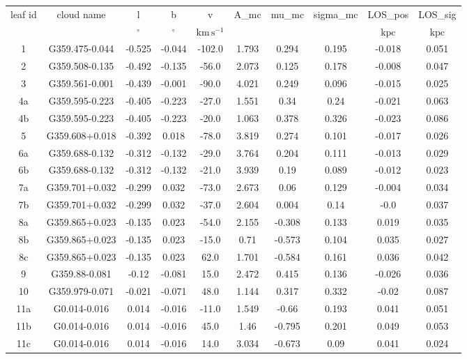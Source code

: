 \begin{table}
\begin{tabular}{cccccccccc}
leaf id & cloud name & l & b & v & A_mc & mu_mc & sigma_mc & LOS_pos & LOS_sig \\
 &  & $\mathrm{{}^{\circ}}$ & $\mathrm{{}^{\circ}}$ & $\mathrm{km\,s^{-1}}$ &  &  &  & $\mathrm{kpc}$ & $\mathrm{kpc}$ \\
1 & G359.475-0.044 & -0.525 & -0.044 & -102.0 & 1.793 & 0.294 & 0.195 & -0.018 & 0.051 \\
2 & G359.508-0.135 & -0.492 & -0.135 & -56.0 & 2.073 & 0.125 & 0.178 & -0.008 & 0.047 \\
3 & G359.561-0.001 & -0.439 & -0.001 & -90.0 & 4.021 & 0.249 & 0.096 & -0.015 & 0.025 \\
4a & G359.595-0.223 & -0.405 & -0.223 & -27.0 & 1.551 & 0.34 & 0.24 & -0.021 & 0.063 \\
4b & G359.595-0.223 & -0.405 & -0.223 & -20.0 & 1.063 & 0.378 & 0.326 & -0.023 & 0.086 \\
5 & G359.608+0.018 & -0.392 & 0.018 & -78.0 & 3.819 & 0.274 & 0.101 & -0.017 & 0.026 \\
6a & G359.688-0.132 & -0.312 & -0.132 & -29.0 & 3.764 & 0.204 & 0.111 & -0.013 & 0.029 \\
6b & G359.688-0.132 & -0.312 & -0.132 & -21.0 & 3.939 & 0.19 & 0.089 & -0.012 & 0.023 \\
7a & G359.701+0.032 & -0.299 & 0.032 & -73.0 & 2.673 & 0.06 & 0.129 & -0.004 & 0.034 \\
7b & G359.701+0.032 & -0.299 & 0.032 & -37.0 & 2.604 & 0.004 & 0.14 & -0.0 & 0.037 \\
8a & G359.865+0.023 & -0.135 & 0.023 & -54.0 & 2.155 & -0.308 & 0.133 & 0.019 & 0.035 \\
8b & G359.865+0.023 & -0.135 & 0.023 & -15.0 & 0.71 & -0.573 & 0.104 & 0.035 & 0.027 \\
8c & G359.865+0.023 & -0.135 & 0.023 & 62.0 & 1.701 & -0.584 & 0.161 & 0.036 & 0.042 \\
9 & G359.88-0.081 & -0.12 & -0.081 & 15.0 & 2.472 & 0.415 & 0.136 & -0.026 & 0.036 \\
10 & G359.979-0.071 & -0.021 & -0.071 & 48.0 & 1.144 & 0.317 & 0.332 & -0.02 & 0.087 \\
11a & G0.014-0.016 & 0.014 & -0.016 & -11.0 & 1.549 & -0.66 & 0.193 & 0.041 & 0.051 \\
11b & G0.014-0.016 & 0.014 & -0.016 & 45.0 & 1.46 & -0.795 & 0.201 & 0.049 & 0.053 \\
11c & G0.014-0.016 & 0.014 & -0.016 & 14.0 & 3.034 & -0.673 & 0.09 & 0.041 & 0.024 \\

\end{tabular}
\end{table}

